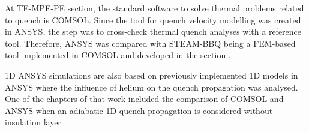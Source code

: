
At TE-MPE-PE section, the standard software to solve thermal problems related to quench is COMSOL. Since the tool for quench velocity modelling was created in ANSYS, the  step was to cross-check thermal quench analyses with a reference tool. Therefore, ANSYS was compared with STEAM-BBQ being a FEM-based tool implemented in COMSOL and developed in the section \cite{BBQ_manual}.

1D ANSYS simulations are also based on previously implemented 1D models in ANSYS where the influence of helium on the quench propagation was analysed. One of the chapters of that work included the comparison of COMSOL and ANSYS when an adiabatic 1D quench propagation is considered without insulation layer \cite{paudel_thesis}. 

